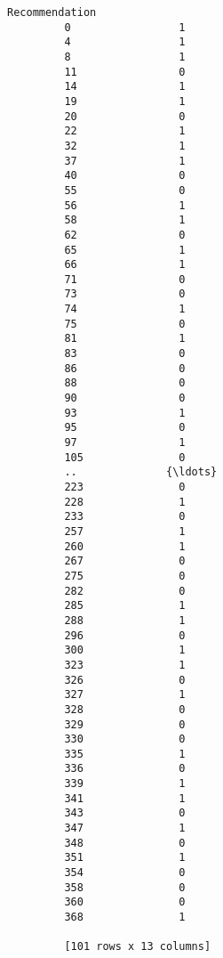\documentclass[11pt]{article}
\begin{document}
\begin{Verbatim}[commandchars=\\\{\}]
              Recommendation  
         0                 1  
         4                 1  
         8                 1  
         11                0  
         14                1  
         19                1  
         20                0  
         22                1  
         32                1  
         37                1  
         40                0  
         55                0  
         56                1  
         58                1  
         62                0  
         65                1  
         66                1  
         71                0  
         73                0  
         74                1  
         75                0  
         81                1  
         83                0  
         86                0  
         88                0  
         90                0  
         93                1  
         95                0  
         97                1  
         105               0  
         ..              {\ldots}  
         223               0  
         228               1  
         233               0  
         257               1  
         260               1  
         267               0  
         275               0  
         282               0  
         285               1  
         288               1  
         296               0  
         300               1  
         323               1  
         326               0  
         327               1  
         328               0  
         329               0  
         330               0  
         335               1  
         336               0  
         339               1  
         341               1  
         343               0  
         347               1  
         348               0  
         351               1  
         354               0  
         358               0  
         360               0  
         368               1  
         
         [101 rows x 13 columns]
\end{Verbatim}
            
\end{document}
